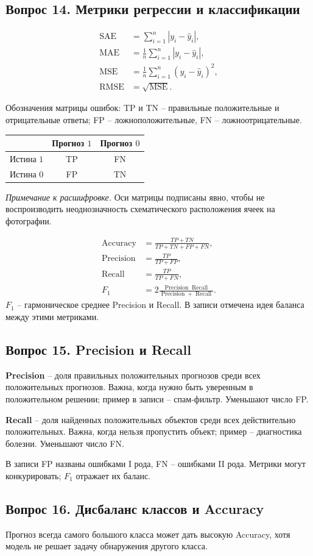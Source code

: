 \documentclass[11pt,a4paper]{article}
\newcommand{\ednote}[1]{\par{\small\color{muted}\textit{Примечание к расшифровке.} #1}\par}
\newcommand{\question}[2]{\subsection{Вопрос #1. #2}}
\newcommand{\MSE}{\operatorname{MSE}}
\newcommand{\MAE}{\operatorname{MAE}}
\newcommand{\RMSE}{\operatorname{RMSE}}
\begin{document}
\question{14}{Метрики регрессии и классификации}
\begin{align*}
 \operatorname{SAE}&=\sum_{i=1}^{n}|y_i-\hat y_i|,\\
 \MAE&=\frac1n\sum_{i=1}^{n}|y_i-\hat y_i|,\\
 \MSE&=\frac1n\sum_{i=1}^{n}(y_i-\hat y_i)^2,\\
 \RMSE&=\sqrt{\MSE}.
\end{align*}

Обозначения матрицы ошибок: TP и TN -- правильные положительные
и отрицательные ответы; FP -- ложноположительные, FN -- ложноотрицательные.

\begin{center}
\begin{tabular}{lcc}
\toprule
 & Прогноз $1$ & Прогноз $0$\\
\midrule
Истина $1$ & TP & FN\\
Истина $0$ & FP & TN\\
\bottomrule
\end{tabular}
\end{center}
\ednote{Оси матрицы подписаны явно, чтобы не воспроизводить
неоднозначность схематического расположения ячеек на фотографии.}

\begin{align*}
 \operatorname{Accuracy}&=\frac{TP+TN}{TP+TN+FP+FN},\\
 \operatorname{Precision}&=\frac{TP}{TP+FP},\\
 \operatorname{Recall}&=\frac{TP}{TP+FN},\\
 F_1&=2\frac{\operatorname{Precision}\operatorname{Recall}}
 {\operatorname{Precision}+\operatorname{Recall}}.
\end{align*}
$F_1$ -- гармоническое среднее Precision и Recall.
В записи отмечена идея баланса между этими метриками.

\question{15}{Precision и Recall}
\textbf{Precision} -- доля правильных положительных прогнозов среди всех
положительных прогнозов. Важна, когда нужно быть уверенным в положительном
решении; пример в записи -- спам-фильтр. Уменьшают число FP.

\textbf{Recall} -- доля найденных положительных объектов среди всех
действительно положительных. Важна, когда нельзя пропустить объект;
пример -- диагностика болезни. Уменьшают число FN.

В записи FP названы ошибками I рода, FN -- ошибками II рода.
Метрики могут конкурировать; $F_1$ отражает их баланс.

\question{16}{Дисбаланс классов и Accuracy}
Прогноз всегда самого большого класса может дать высокую Accuracy,
хотя модель не решает задачу обнаружения другого класса.
\end{document}
